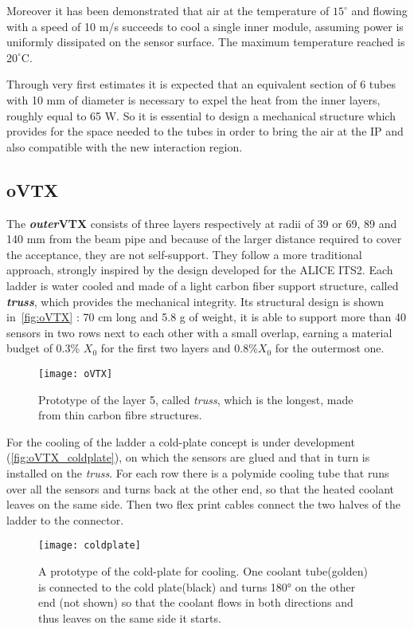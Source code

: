 Moreover it has been demonstrated that air at the temperature of $15^{\circ}$ and flowing with a speed of 10 m/s succeeds to cool a single inner module, assuming power is uniformly dissipated on the sensor surface. The maximum temperature reached is $20^{\circ}$C. 

Through very first estimates it is expected that an equivalent section of 6 tubes with 10 mm of diameter is necessary to expel the heat from the inner layers, roughly equal to 65 W. So it is essential to design a mechanical structure which provides for the space needed to the tubes in order to bring the air at the IP and also compatible with the new interaction region.


\subsection{oVTX} \label{sec:oVTX}

The \textbf{\textit{outer}VTX} consists of three layers respectively at radii of 39 or 69, 89 and 140 mm from the beam pipe and because of the larger distance required to cover the acceptance, they are not self-support. They follow a more traditional approach, strongly inspired by the design developed for the ALICE ITS2. Each ladder is water cooled and made of a light carbon fiber support structure, called \textbf{\textit{truss}}, which provides the mechanical integrity. Its structural design is shown in~\autoref{fig:oVTX} : 70 cm long and 5.8 g of weight, it is able to support more than 40 sensors in two rows next to each other with a small overlap, earning a material budget of 0.3\% $X_{0}$ for the first two layers and 0.8\%$X_{0}$  for the outermost one.

\begin{figure}[h!]
\centering
\texttt{[image: oVTX]}
\caption{Prototype of the layer 5, called \textit{truss}, which is the longest, made from thin carbon fibre structures.}
\label{fig:oVTX}
\end{figure}


For the cooling of the ladder a cold-plate concept is under development (\autoref{fig:oVTX_coldplate}), on which the sensors are glued and that in turn is installed on the \textit{truss}. For each row there is a polymide cooling tube that runs over all the sensors and turns back at the other end, so that the heated coolant leaves on the same side. Then two flex print cables connect the two halves of the ladder to the connector.


\begin{figure}[h!]
\centering
\texttt{[image: coldplate]}
\caption{A prototype of the cold-plate for cooling. One coolant tube(golden) is connected to the cold plate(black) and turns 180° on the other end (not shown) so that the coolant flows in both directions and thus leaves on the same side it starts.}
\label{fig:oVTX_coldplate}
\end{figure}

